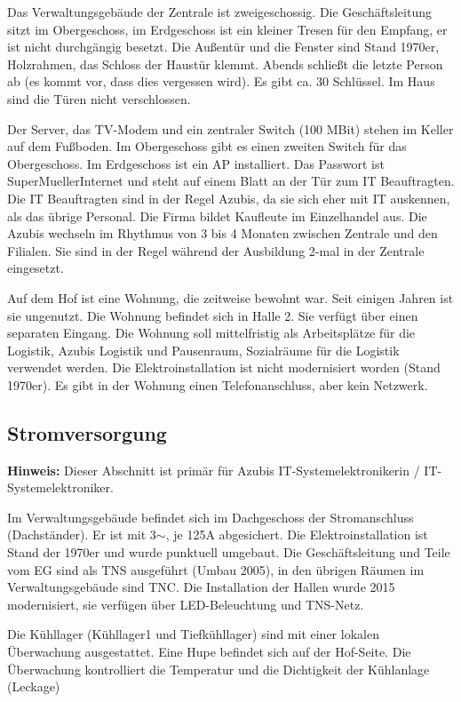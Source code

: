 \documentclass[a4paper,10pt]{scrreprt}
\begin{document}
Das Verwaltungsgebäude der Zentrale ist zweigeschossig. Die Geschäftsleitung sitzt im Obergeschoss, im Erdgeschoss ist ein kleiner Tresen für den Empfang, er ist nicht durchgängig besetzt. Die Außentür und die Fenster sind Stand 1970er, Holzrahmen, das Schloss der Haustür klemmt. Abends schließt die letzte Person ab (es kommt vor, dass dies vergessen wird). Es gibt ca. 30 Schlüssel. Im Haus sind die Türen nicht verschlossen.

Der Server, das TV-Modem und ein zentraler Switch (100 MBit) stehen im Keller auf dem Fußboden. Im Obergeschoss gibt es einen zweiten Switch für das Obergeschoss. Im Erdgeschoss ist ein AP installiert. Das Passwort ist SuperMuellerInternet und steht auf einem Blatt an der Tür zum IT
Beauftragten. Die IT Beauftragten sind in der Regel Azubis, da sie sich eher mit IT auskennen, als das übrige Personal. Die Firma bildet Kaufleute im
Einzelhandel aus. Die Azubis wechseln im Rhythmus von 3 bis 4 Monaten zwischen Zentrale und den Filialen. Sie sind in der Regel während der
Ausbildung 2-mal in der Zentrale eingesetzt.

Auf dem Hof ist eine Wohnung, die zeitweise bewohnt war. Seit einigen Jahren ist sie ungenutzt. Die Wohnung befindet sich in Halle 2. Sie verfügt über einen separaten Eingang. Die Wohnung soll mittelfristig als Arbeitsplätze für die Logistik, Azubis Logistik und Pausenraum, Sozialräume für die Logistik verwendet werden. Die Elektroinstallation ist nicht modernisiert worden (Stand 1970er). Es gibt in der Wohnung einen Telefonanschluss, aber kein Netzwerk.

\subsection{Stromversorgung}
\textbf{Hinweis:} Dieser Abschnitt ist primär für Azubis IT-Sys\-tem\-elek\-tro\-ni\-ke\-rin / IT-Sys\-tem\-elek\-tro\-ni\-ker.

Im Verwaltungsgebäude befindet sich im Dachgeschoss der Stromanschluss (Dachständer). Er ist mit 3$\sim$, je 125A abgesichert. Die Elektroinstallation ist Stand der
1970er und wurde punktuell umgebaut. Die Geschäftsleitung und Teile vom EG sind als TNS ausgeführt (Umbau 2005), in den übrigen Räumen im Verwaltungsgebäude sind TNC. Die Installation der Hallen wurde 2015 modernisiert, sie verfügen über LED-Beleuchtung und TNS-Netz.

Die Kühllager (Kühllager1 und Tiefkühllager) sind mit einer lokalen Überwachung ausgestattet. Eine Hupe befindet sich auf der Hof-Seite. Die
Überwachung kontrolliert die Temperatur und die Dichtigkeit der Kühlanlage (Leckage)
\end{document}
